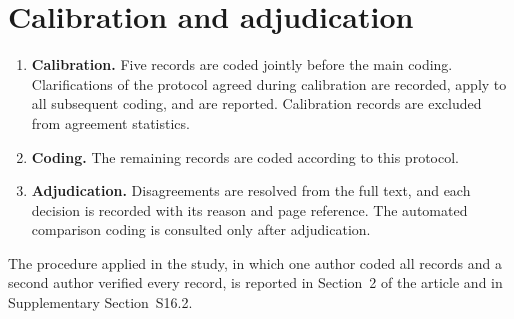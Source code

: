\documentclass[10pt,a4paper]{article}
\begin{document}
\section{Calibration and adjudication}
\begin{enumerate}[leftmargin=*]
\item \textbf{Calibration.} Five records are coded jointly before the main coding. Clarifications of the protocol agreed during calibration are recorded, apply to all subsequent coding, and are reported. Calibration records are excluded from agreement statistics.
\item \textbf{Coding.} The remaining records are coded according to this protocol.
\item \textbf{Adjudication.} Disagreements are resolved from the full text, and each decision is recorded with its reason and page reference. The automated comparison coding is consulted only after adjudication.
\end{enumerate}
The procedure applied in the study, in which one author coded all records and a second author verified every record, is reported in Section~2 of the article and in Supplementary Section~S16.2.
\end{document}
